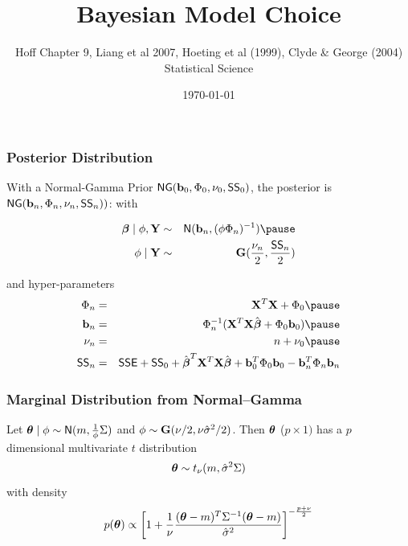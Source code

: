 \documentclass[]{beamer}
\title{Bayesian Model Choice}
\author{Hoff Chapter 9, Liang et al 2007, Hoeting et al (1999), Clyde \&
 George (2004) Statistical Science}
\date{\today}
\begin{document}

\maketitle


\begin{frame}
  \frametitle{Posterior Distribution}
With a Normal-Gamma Prior $\textsf{NG}(\mathbf{b}_0, \Phi_0, \nu_0, \textsf{SS}_0)$, the posterior is $\textsf{NG}(\mathbf{b}_n, \Phi_n, \nu_n, \textsf{SS}_n))$: with 

\begin{eqnarray*}
\b \mid \phi, \Y & \sim &\N(\bv_n, (\phi \Phi_n)^{-1}) \pause \\
\phi \mid \Y &\sim &\G(\frac{\nu_n}{2}, \frac{\SS_n}{2})
  \end{eqnarray*}

and hyper-parameters
  \begin{eqnarray*}
\Phi_n & = & \X^T\X +  \Phi_0 \pause \\
\bv_n  & = & \Phi_n^{-1} (\X^T\X \bhat  + \Phi_0 \bv_0) \pause \\
\nu_n & = &  n + \nu_0 \pause \\
\SS_n & = &\SSE + \SS_0 + \bhat^T \X^T\X \bhat + \bv_0^T \Phi_0 \bv_0
 - \bv_n^T \Phi_n \bv_n
  \end{eqnarray*}


\end{frame}
\begin{frame}
  \frametitle{Marginal Distribution from Normal--Gamma }
  \begin{theorem}
    Let  $\boldsymbol{\theta} \mid \phi \sim \textsf{N}(m, \frac{1}{\phi} \Sigma)$ and $\phi \sim
    \mathbf{G}(\nu/2, \nu {\hat{\sigma}}^2/2)$. Then  $\boldsymbol{\theta}$ ($p \times 1)$ has a $p$
    dimensional multivariate $t$ distribution $$\boldsymbol{\theta} \sim t_\nu( m,
    {\hat{\sigma}}^2 \Sigma )$$ with density
$$p(\boldsymbol{\theta}) \propto  \left[ 1 + \frac{1}{\nu}  \frac{ (\boldsymbol{\theta} - m)^T
    \Sigma^{-1} (\boldsymbol{\theta} - m)}{{\hat{\sigma}}^2} \right]^{- \frac{p + \nu}{2}}$$
  \end{theorem}
\end{frame}
\end{document}

